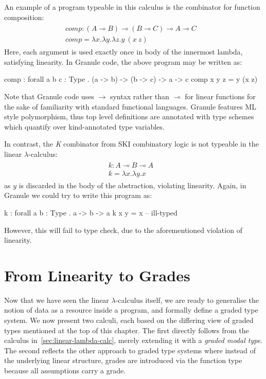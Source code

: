 \begin{example}
  \label{example:linear-granule}
An example of a program typeable in this calculus is the combinator for function
composition: 
\begin{align*}
\begin{array}{ll}
    comp: (A \multimap B) \multimap (B \multimap C) \multimap A \multimap C &
    \\
    comp = \lambda x. \lambda y. \lambda z. y\ (x\ z) &
\end{array}  
\end{align*}
Here, each argument is used exactly once in body of the innermost lambda, satisfying 
linearity. In Granule code, the above program may be written as:
\begin{granule}
comp : forall { a b c : Type } . (a -> b) -> (b -> c) -> a -> c
comp x y z = y (x z)
\end{granule}
Note that Granule code uses $\rightarrow$ syntax rather than $\multimap$ for
linear functions for the sake of familiarity with standard functional languages.
Granule features ML style polymorphism, thus top level definitions are annotated
with type schemes which quantify over kind-annotated type variables.

In contrast, the \emph{K} combinator from SKI combinatory logic is not typeable in the 
linear $\lambda$-calculus:
\label{k-example}
\begin{align*}
  \tag{ill-typed}
\begin{array}{ll}
    k : A \multimap B \multimap A &
    \\
    k = \lambda x. \lambda y. x &
\end{array}  
\end{align*}
as $y$ is discarded in the body of the abstraction, violating linearity. Again, 
in Granule we could try to write this program as:
\begin{granule}
k : forall { a b : Type } . a -> b -> a
k x y = x             -- ill-typed
\end{granule}
However, this will fail to type check, due to the aforementioned violation of
linearity.
\end{example}

\section{From Linearity to Grades}
\label{sec:graded-linear}
Now that we have seen the linear $\lambda$-calculus itself, we are ready to
generalise the notion of data as a resource inside a program, and formally
define a graded type system. We now present two calculi, each based on the
differing view of graded types mentioned at the top of this chapter. The first
directly follows from the calculus in~\ref{sec:linear-lambda-calc}, merely
extending it with a \emph{graded modal type}. The second reflects the other
approach to graded type systems where instead of the underlying linear
structure, grades are introduced via the function type because all assumptions
carry a grade.

